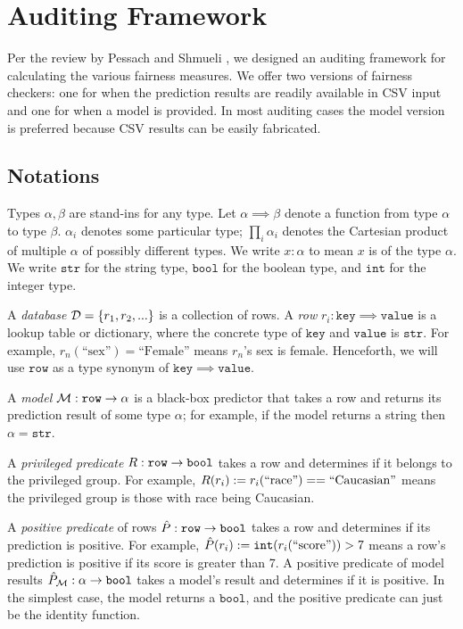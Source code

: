 \documentclass[conference]{IEEEtran}
\begin{document}
\section{Auditing Framework}
\label{sec:framework}
Per the review by Pessach and Shmueli \cite{pessach2022review}, we designed an auditing framework for calculating the various fairness measures. We offer two versions of fairness checkers: one for when the prediction results are readily available in CSV input and one for when a model is provided. In most auditing cases the model version is preferred because CSV results can be easily fabricated.

\subsection{Notations}
Types $\alpha,\beta$ are stand-ins for any type. Let $\alpha \implies \beta$ denote a function from type $\alpha$ to type $\beta$. $\alpha_i$ denotes some particular type; $\prod_i \alpha_i$ denotes the Cartesian product of multiple $\alpha$ of possibly different types. We write $x : \alpha$ to mean $x$ is of the type $\alpha$. We write $\mathtt{str}$ for the string type, $\mathtt{bool}$ for the boolean type, and $\mathtt{int}$ for the integer type.

A \emph{database} $\mathcal{D} = \{r_1, r_2, ...\}$ is a collection of rows. A \emph{row} $r_i : \mathtt{key} \implies \mathtt{value}$ is a lookup table or dictionary, where the concrete type of $\mathtt{key}$ and $\mathtt{value}$ is $\mathtt{str}$. For example, $r_n(\text{``sex''}) = \text{``Female''}$ means $r_n$'s sex is female. Henceforth, we will use $\mathtt{row}$ as a type synonym of $\mathtt{key} \implies \mathtt{value}$.

A \emph{model} $\mathcal{M} : \mathtt{row} \rightarrow \alpha$ is a black-box predictor that takes a row and returns its prediction result of some type $\alpha$; for example, if the model returns a string then $\alpha = \mathtt{str}$.

A \emph{privileged predicate} $R : \mathtt{row} \rightarrow \mathtt{bool}$ takes a row and determines if it belongs to the privileged group. For example, $R(r_i) := r_i(\text{``race''}) == \text{``Caucasian''}$ means the privileged group is those with race being Caucasian.

A \emph{positive predicate} of rows $\hat{P} : \mathtt{row} \rightarrow \mathtt{bool}$ takes a row and determines if its prediction is positive. For example, $\hat{P}(r_i) := \mathtt{int}(r_i(\text{``score''})) > 7$ means a row's prediction is positive if its score is greater than 7. A positive predicate of model results $\hat{P}_\mathcal{M} : \alpha \rightarrow \mathtt{bool}$ takes a model's result and determines if it is positive. In the simplest case, the model returns a $\mathtt{bool}$, and the positive predicate can just be the identity function.
\end{document}
